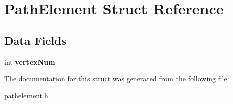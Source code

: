\hypertarget{struct_path_element}{}\section{Path\+Element Struct Reference}
\label{struct_path_element}
\subsection*{Data Fields}
\begin{DoxyCompactItemize}
\item 
int {\bfseries vertex\+Num}\hypertarget{struct_path_element_a39a0787c472a83a671bab558b6201a15}{}\label{struct_path_element_a39a0787c472a83a671bab558b6201a15}

\end{DoxyCompactItemize}


The documentation for this struct was generated from the following file\+:\begin{DoxyCompactItemize}
\item 
pathelement.\+h\end{DoxyCompactItemize}
